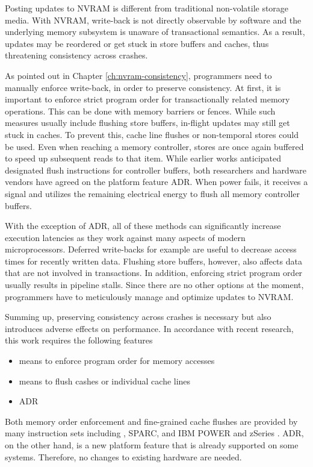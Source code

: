 Posting updates to \ac{NVRAM} is different from traditional non-volatile storage
media. With \ac{NVRAM}, write-back is not directly observable by software and
the underlying memory subsystem is unaware of transactional semantics. As a
result, updates may be reordered or get stuck in store buffers and caches, thus
threatening consistency across crashes.

As pointed out in Chapter \ref{ch:nvram-consistency}, programmers need to
manually enforce write-back, in order to preserve consistency. At first, it is
important to enforce strict program order for transactionally related memory
operations. This can be done with memory barriers or fences. While such measures
usually include flushing store buffers, in-flight updates may still get stuck in
caches. To prevent this, cache line flushes or non-temporal stores could be
used. Even when reaching a memory controller, stores are once again buffered to
speed up subsequent reads to that item. While earlier works anticipated
designated flush instructions for controller buffers, both researchers and
hardware vendors have agreed on the platform feature \ac{ADR}. When power fails,
it receives a signal and utilizes the remaining electrical energy to flush all
memory controller buffers.

With the exception of \ac{ADR}, all of these methods can significantly increase
execution latencies as they work against many aspects of modern microprocessors.
Deferred write-backs for example are useful to decrease access times for
recently written data. Flushing store buffers, however, also affects data that
are not involved in transactions. In addition, enforcing strict program order
usually results in pipeline stalls. Since there are no other options at the
moment, programmers have to meticulously manage and optimize updates to
\ac{NVRAM}.

Summing up, preserving consistency across crashes is necessary but also
introduces adverse effects on performance. In accordance with recent research,
this work requires the following features

\begin{itemize}
    \item means to enforce program order for memory accesses
    \item means to flush cashes or individual cache lines
    \item \ac{ADR}
\end{itemize}

Both memory order enforcement and fine-grained cache flushes are provided by
many instruction sets including , SPARC, and IBM POWER and zSeries
\cite{mckenney2007memory}. \ac{ADR}, on the other hand, is a new platform
feature that is already supported on some systems. Therefore, no changes to
existing hardware are needed.
